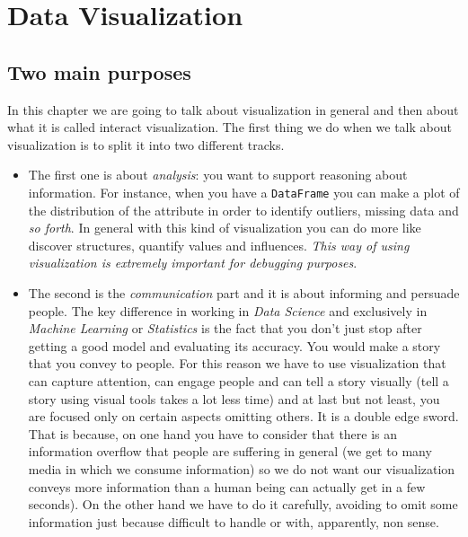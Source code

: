

\section{Data Visualization}


\subsection{Two main purposes}

In this chapter we are going to talk about visualization in general and then about what it is called interact visualization. The first thing we do when we talk about visualization is to split it into two different tracks. 

\begin{itemize}
\item {The first one is about \emph{analysis}: you want to support reasoning about information. For instance, when you have a \texttt{DataFrame} you can make a plot of the distribution of the attribute in order to identify outliers, missing data and \emph{so forth}. In general with this kind of visualization you can do more like discover structures, quantify values and influences.
\emph{This way of using visualization is extremely important for debugging purposes}.}

\item{The second  is the \emph{communication} part and it is about informing and persuade people.  The key difference in working in \emph{Data Science} and exclusively in \emph{Machine Learning} or \emph{Statistics} is the fact that you don't just stop after getting a good model and evaluating its accuracy. You would make a story that you convey to people.
For this reason we have to use visualization that can capture attention, can engage people and can tell a story visually (tell a story using visual tools takes a lot less time) and at last but not least, you are focused only on certain aspects omitting others. It is a double edge sword. That is because, on one hand you have to consider that there is an information overflow that people are suffering in general (we get to many media in which we consume information) so we do not want our visualization conveys more information than  a human being can actually get in a few seconds). On the other hand we have to do it carefully, avoiding to omit some information just because difficult to handle or with, apparently, non sense.}
\end{itemize}


